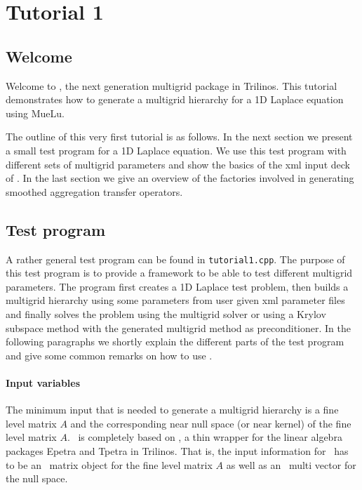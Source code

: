 \section{Tutorial 1}
\subsection{Welcome}
Welcome to \MueLu, the next generation multigrid package in Trilinos. This tutorial demonstrates how to generate a multigrid hierarchy for a 1D Laplace equation using MueLu.

The outline of this very first tutorial is as follows. In the next section we present a small test program for a 1D Laplace equation. We use this test program with different sets of multigrid parameters and show the basics of the xml input deck of \MueLu. In the last section we give an overview of the factories involved in generating smoothed aggregation transfer operators.

\subsection{Test program}
A rather general test program can be found in \texttt{tutorial1.cpp}. The purpose of this test program is to provide a framework to be able to test different multigrid parameters. The program first creates a 1D Laplace test problem, then builds a multigrid hierarchy using some parameters from user given xml parameter files and finally solves the problem using the multigrid solver or using a Krylov subspace method with the generated multigrid method as preconditioner. In the following paragraphs we shortly explain the different parts of the test program and give some common remarks on how to use \MueLu. 

\paragraph{Input variables}
The minimum input that is needed to generate a multigrid hierarchy is a fine level matrix $A$ and the corresponding near null space (or near kernel) of the fine level matrix $A$. \MueLu~is completely based on \Xpetra, a thin wrapper for the linear algebra packages Epetra and Tpetra in Trilinos. That is, the input information for \MueLu~has to be an \Xpetra~matrix object for the fine level matrix $A$ as well as an \Xpetra~multi vector for the null space.

